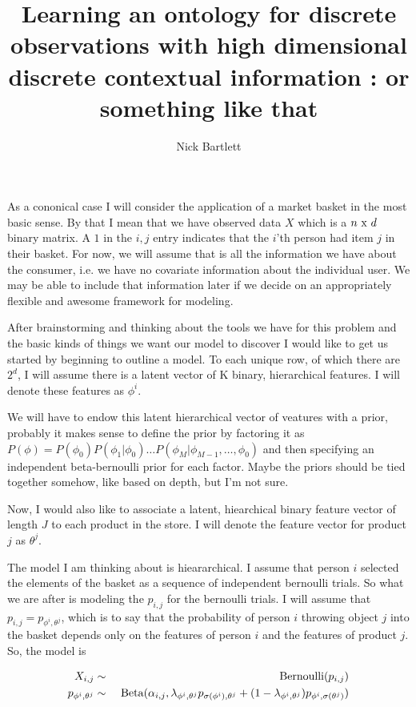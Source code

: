 \documentclass[11pt]{article}
\title{Learning an ontology for discrete observations with high dimensional discrete contextual information : or something like that}
\author{Nick Bartlett}
\begin{document}
\maketitle

As a cononical case I will consider the application of a market basket in the most basic sense.  By that I mean that we have observed data $X$ which is a $n \ {\rm x } \ d$ binary matrix.  A $1$ in the $i,j$ entry indicates that the $i$'th person had item $j$ in their basket.  For now, we will assume that is all the information we have about the consumer, i.e. we have no covariate information about the individual user.  We may be able to include that information later if we decide on an appropriately flexible and awesome framework for modeling.  

After brainstorming and thinking about the tools we have for this problem and the basic kinds of things we want our model to discover I would like to get us started by beginning to outline a model.  To each unique row, of which there are $2^d$, I will assume there is a latent vector of K binary, hierarchical features.  I will denote these features as $\phi^i$.

We will have to endow this latent hierarchical vector of veatures with a prior, probably it makes sense to define the prior by factoring it as $P(\phi) = P(\phi_0)P(\phi_1 | \phi_0) \ldots P(\phi_M| \phi_{M-1}, \ldots, \phi_0)$ and then specifying an independent beta-bernoulli prior for each factor.  Maybe the priors should be tied together somehow, like based on depth, but I'm not sure. 

Now, I would also like to associate a latent, hiearchical binary feature vector of length $J$ to each product in the store.  I will denote the feature vector for product $j$ as $\theta^j$.

The model I am thinking about is hieararchical.  I assume that person $i$ selected the elements of the basket as a sequence of independent bernoulli trials.  So what we are after is modeling the $p_{i,j}$ for the bernoulli trials.  I will assume that $p_{i,j} = p_{\phi^i, \theta^j}$, which is to say that the probability of person $i$ throwing object $j$ into the basket depends only on the features of person $i$ and the features of product $j$.  So, the model is

\begin{eqnarray*}
  X_{i,j} &\sim& \ {\rm Bernoulli}(p_{i,j})\\
  p_{\phi^i,\theta^j} &\sim& \ {\rm Beta}(\alpha_{i,j}, \lambda_{\phi^i,\theta^j} p_{\sigma(\phi^i),\theta^j} + (1 - \lambda_{\phi^i, \theta^j})p_{\phi^i,\sigma(\theta^j)})
\end{eqnarray*}
\end{document}
